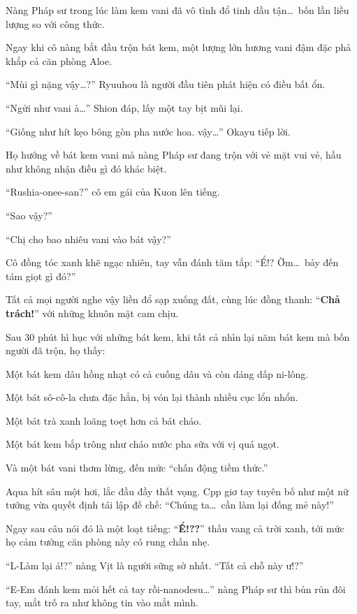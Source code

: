 \documentclass[../main.tex]{subfiles}
\begin{document}
Nàng Pháp sư trong lúc làm kem vani đã vô tình đổ tinh dầu tận\dots\ bốn lần liều lượng so với công thức.

Ngay khi cô nàng bắt đầu trộn bát kem, một lượng lớn hương vani đậm đặc phả khắp cả căn phòng Aloe.

``Mùi gì nặng vậy\dots?'' Ryuuhou là người đầu tiên phát hiện có điều bất ổn.

``Ngửi như vani à\dots'' Shion đáp, lấy một tay bịt mũi lại.

``Giống như hít kẹo bông gòn pha nước hoa. vậy\dots'' Okayu tiếp lời.

Họ hướng về bát kem vani mà nàng Pháp sư đang trộn với vẻ mặt vui vẻ, hầu như không nhận điều gì đó khác biệt.

``Rushia-onee-san?'' cô em gái của Kuon lên tiếng.

``Sao vậy?''

``Chị cho bao nhiêu vani vào bát vậy?''

Cô đồng tóc xanh khẽ ngạc nhiên, tay vẫn đánh tăm tắp: ``Ể!? Ờm\dots\ bảy đến tám giọt gì đó?''

Tất cả mọi người nghe vậy liền đổ sạp xuống đất, cùng lúc đồng thanh: ``\textbf{Chả trách!}'' với những khuôn mặt cam chịu.

\ct

Sau 30 phút hì hục với những bát kem, khi tất cả nhìn lại năm bát kem mà bốn người đã trộn, họ thấy:

Một bát kem dâu hồng nhạt có cả cuống dâu và còn dáng dấp ni-lông.

Một bát sô-cô-la chưa đặc hẳn, bị vón lại thành nhiều cục lổn nhổn.

Một bát trà xanh loãng toẹt hơn cả bát cháo.

Một bát kem bắp trông như cháo nước pha sữa với vị quá ngọt.

Và một bát vani thơm lừng, đến mức ``chấn động tiềm thức.''

Aqua hít sâu một hơi, lắc đầu đầy thất vọng. Cpp giơ tay tuyên bố như một nữ tướng vừa quyết định tái lập đế chế: ``Chúng ta\dots\ cần làm lại đống mẻ này!''

Ngay sau câu nói đó là một loạt tiếng: ``\textbf{Ể!??}'' thấu vang cả trời xanh, tới mức họ cảm tưởng căn phòng này có rung chấn nhẹ.

``L-Làm lại á!?'' nàng Vịt là người sững sờ nhất. ``Tất cả chỗ này ư!?''

``E-Em đánh kem mỏi hết cả tay rồi-nanodesu\dots'' nàng Pháp sư thì bủn rủn đôi tay, mắt trố ra như không tin vào mắt mình.
\end{document}
